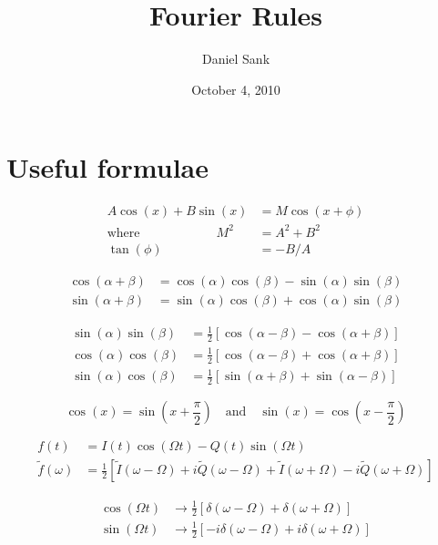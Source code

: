 \documentclass{article}
\author{Daniel Sank}
\title{Fourier Rules}
\date{October 4, 2010}
\begin{document}
\maketitle

\section*{Useful formulae}

\begin{align*}
  A \cos(x) + B \sin(x) &= M \cos(x+\phi) \\
  \textrm{where} \qquad \qquad \qquad M^{2} &= A^{2}+B^{2} \\
  \tan(\phi) &= -B / A
\end{align*}

\begin{align*}
  \cos ( \alpha + \beta ) & =
    \cos ( \alpha ) \cos ( \beta ) - \sin ( \alpha ) \sin ( \beta ) \\
  \sin ( \alpha + \beta ) & =
    \sin ( \alpha ) \cos ( \beta ) + \cos ( \alpha ) \sin ( \beta )
\end{align*}

\begin{align*}
  \sin(\alpha) \sin(\beta) & =
    \frac{1}{2} \left[ \cos (\alpha - \beta) - \cos(\alpha + \beta) \right] \\
  \cos(\alpha) \cos(\beta) & =
    \frac{1}{2} \left[ \cos (\alpha - \beta) + \cos(\alpha + \beta) \right]\\
  \sin(\alpha) \cos(\beta) &=
    \frac{1}{2} \left[ \sin (\alpha + \beta) + \sin(\alpha - \beta) \right]
\end{align*}

\begin{equation*}
  \cos(x) = \sin\left(x + \frac{\pi}{2} \right)
  \quad \textrm{and} \quad
  \sin(x) = \cos\left(x - \frac{\pi}{2} \right)
\end{equation*}

\begin{align*}
  f(t) &= I(t) \cos(\Omega t) - Q(t) \sin(\Omega t) \\
  \tilde{f}(\omega) &= \frac{1}{2} \left[
    \tilde I(\omega - \Omega) + i \tilde Q(\omega - \Omega)
    + \tilde I(\omega + \Omega) - i \tilde Q(\omega + \Omega)
    \right]
\end{align*}

\begin{align*}
  \cos(\Omega t) &\rightarrow \frac{1}{2} \left[ \delta(\omega - \Omega) + \delta(\omega + \Omega) \right] \\
  \sin(\Omega t) &\rightarrow \frac{1}{2} \left[ -i \delta(\omega - \Omega) + i \delta(\omega + \Omega) \right] 
\end{align*}
\end{document}

